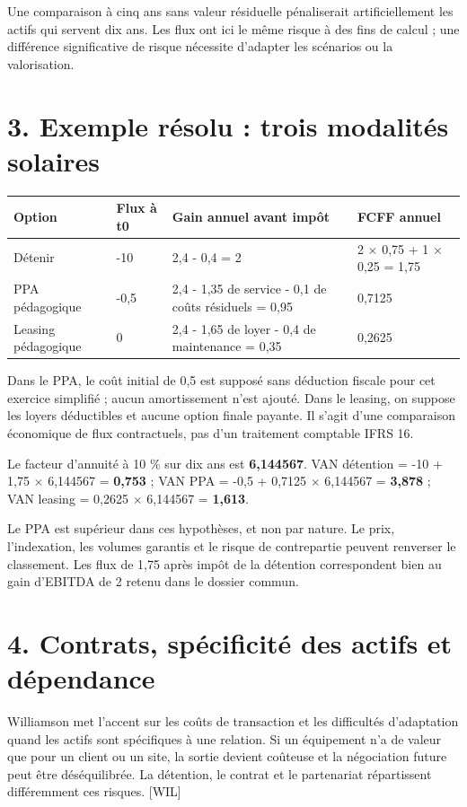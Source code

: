 \documentclass[12pt,a4paper]{article}
\begin{document}
Une comparaison à cinq ans sans valeur résiduelle pénaliserait artificiellement les actifs qui servent dix ans. Les flux ont ici le même risque à des fins de calcul ; une différence significative de risque nécessite d’adapter les scénarios ou la valorisation.

\section*{3. Exemple résolu : trois modalités solaires}

\Needspace{180pt}
\begin{longtable}{p{3.67cm}p{3.67cm}p{3.67cm}p{3.67cm}}
\toprule
Option & Flux à t0 & Gain annuel avant impôt & FCFF annuel \\
\midrule\endhead
Détenir & -10 & 2,4 - 0,4 = 2 & 2 $\times$ 0,75 + 1 $\times$ 0,25 = 1,75 \\
PPA pédagogique & -0,5 & 2,4 - 1,35 de service - 0,1 de coûts résiduels = 0,95 & 0,7125 \\
Leasing pédagogique & 0 & 2,4 - 1,65 de loyer - 0,4 de maintenance = 0,35 & 0,2625 \\
\bottomrule
\end{longtable}

Dans le PPA, le coût initial de 0,5 est supposé sans déduction fiscale pour cet exercice simplifié ; aucun amortissement n’est ajouté. Dans le leasing, on suppose les loyers déductibles et aucune option finale payante. Il s’agit d’une comparaison économique de flux contractuels, pas d’un traitement comptable IFRS 16.


Le facteur d’annuité à 10 \% sur dix ans est \textbf{6,144567}. VAN détention = -10 + 1,75 $\times$ 6,144567 = \textbf{0,753} ; VAN PPA = -0,5 + 0,7125 $\times$ 6,144567 = \textbf{3,878} ; VAN leasing = 0,2625 $\times$ 6,144567 = \textbf{1,613}.


Le PPA est supérieur dans ces hypothèses, et non par nature. Le prix, l’indexation, les volumes garantis et le risque de contrepartie peuvent renverser le classement. Les flux de 1,75 après impôt de la détention correspondent bien au gain d’EBITDA de 2 retenu dans le dossier commun.

\section*{4. Contrats, spécificité des actifs et dépendance}
Williamson met l’accent sur les coûts de transaction et les difficultés d’adaptation quand les actifs sont spécifiques à une relation. Si un équipement n’a de valeur que pour un client ou un site, la sortie devient coûteuse et la négociation future peut être déséquilibrée. La détention, le contrat et le partenariat répartissent différemment ces risques. [WIL]
\end{document}
